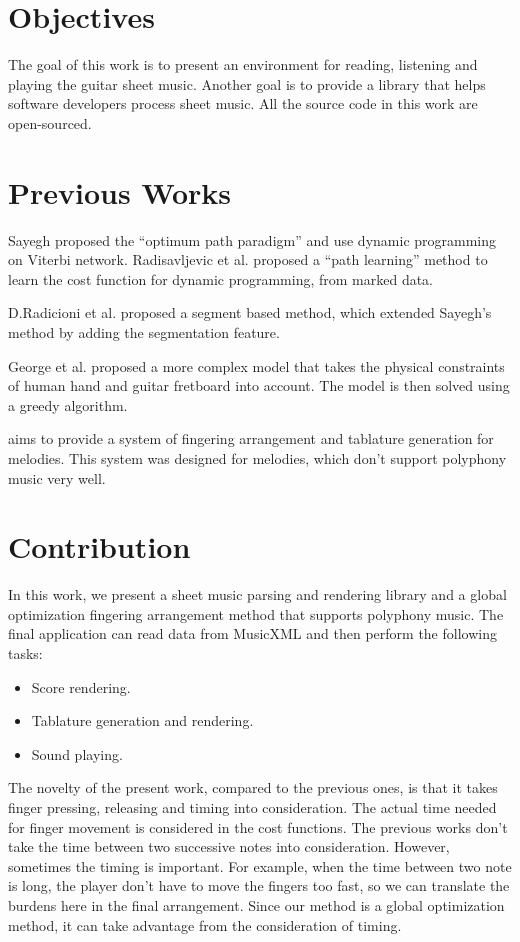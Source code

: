 \section{Objectives}
The goal of this work is to present an environment for reading, listening and playing the guitar sheet music. Another goal is to provide a library that helps software developers process sheet music. All the source code in this work are open-sourced.

\section{Previous Works}
Sayegh \citep{sayegh1989fingering} proposed the ``optimum path paradigm'' and use dynamic programming on Viterbi network.
Radisavljevic et al.\citep{radisavljevic2004path} proposed a ``path learning'' method to learn the cost function for dynamic programming, from marked data.

D.Radicioni et al.\citep{radicioni2004segmentation} proposed a segment based method, which extended Sayegh's method by adding the segmentation feature.

George et al.\citep{elkoura2003handrix} proposed a more complex model that takes the physical constraints of human hand and guitar fretboard into account. The model is then solved using a greedy algorithm.

\citep{constructing-system} aims to provide a system of fingering arrangement and tablature generation for melodies. This system was designed for melodies, which don't support polyphony music very well.

\section{Contribution}
In this work, we present a sheet music parsing and rendering library and a global optimization fingering arrangement method that supports polyphony music. The final application can read data from MusicXML \citep{good2001musicxml} and then perform the following tasks:
\begin{itemize}
    \item Score rendering.
    \item Tablature generation and rendering.
    \item Sound playing.
\end{itemize}

The novelty of the present work, compared to the previous ones, is that it takes finger pressing, releasing and timing into consideration. The actual time needed for finger movement is considered in the cost functions. The previous works don't take the time between two successive notes into consideration. However, sometimes the timing is important. For example, when the time between two note is long, the player don't have to move the fingers too fast, so we can translate the burdens here in the final arrangement. Since our method is a global optimization method, it can take advantage from the consideration of timing.


